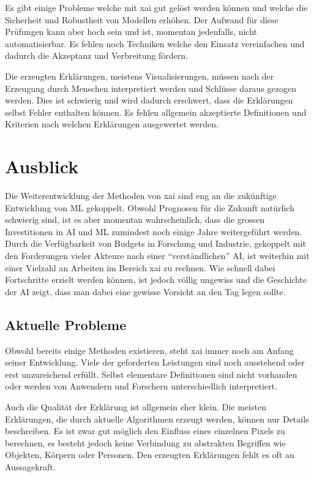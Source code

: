 \documentclass[
  12pt, %
  a4paper, %
  oneside, %
  openany, 
  numbers=noenddot, %
  BCOR=5mm, %
  parskip=half*, %
  thesis, %
]{bfhbook}
\begin{document}
Es gibt einige Probleme welche mit \Gls{xai} gut gelöst werden können und welche die Sicherheit und Robustheit von Modellen erhöhen. Der Aufwand für diese Prüfungen kann aber hoch sein und ist, momentan jedenfalls, nicht automatisierbar. Es fehlen noch Techniken welche den Einsatz vereinfachen und dadurch die Akzeptanz und Verbreitung fördern.

Die erzeugten Erklärungen, meistens Visualisierungen, müssen nach der Erzeugung durch Menschen interpretiert werden und Schlüsse daraus gezogen werden. Dies ist schwierig und wird dadurch erschwert, dass die Erklärungen selbst Fehler enthalten können. Es fehlen allgemein akzeptierte Definitionen und Kriterien nach welchen Erklärungen ausgewertet werden.

\chapter{Ausblick}
Die Weiterentwicklung der Methoden von \Gls{xai} sind eng an die zukünftige Entwicklung von \Gls{ML} gekoppelt. Obwohl Prognosen für die Zukunft natürlich schwierig sind, ist es aber momentan wahrscheinlich, dass die grossen Investitionen in \Gls{AI} und \Gls{ML} zumindest noch einige Jahre weitergeführt werden. Durch die Verfügbarkeit von Budgets in Forschung und Industrie, gekoppelt mit den Forderungen vieler Akteure nach einer ``verständlichen'' \Gls{AI}, ist weiterhin mit einer Vielzahl an Arbeiten im Bereich \Gls{xai} zu rechnen. Wie schnell dabei Fortschritte erzielt werden können, ist jedoch völlig ungewiss und die Geschichte der \Gls{AI} zeigt, dass man dabei eine gewisse Vorsicht an den Tag legen sollte.

\section{Aktuelle Probleme}
Obwohl bereits einige Methoden existieren, steht \Gls{xai} immer noch am Anfang seiner Entwicklung. Viele der geforderten Leistungen  sind noch ausstehend oder erst unzureichend erfüllt. Selbst elementare Definitionen sind nicht vorhanden oder werden von Anwendern und Forschern unterschiedlich interpretiert.  

Auch die Qualität der Erklärung ist allgemein eher klein. Die meisten Erklärungen, die durch aktuelle Algorithmen erzeugt werden, können nur Details beschreiben. Es ist zwar gut möglich den Einfluss eines einzelnen Pixels zu berechnen, es besteht jedoch keine Verbindung zu abstrakten Begriffen wie Objekten, Körpern oder Personen. Den erzeugten Erklärungen fehlt es oft an Aussagekraft.
\end{document}
